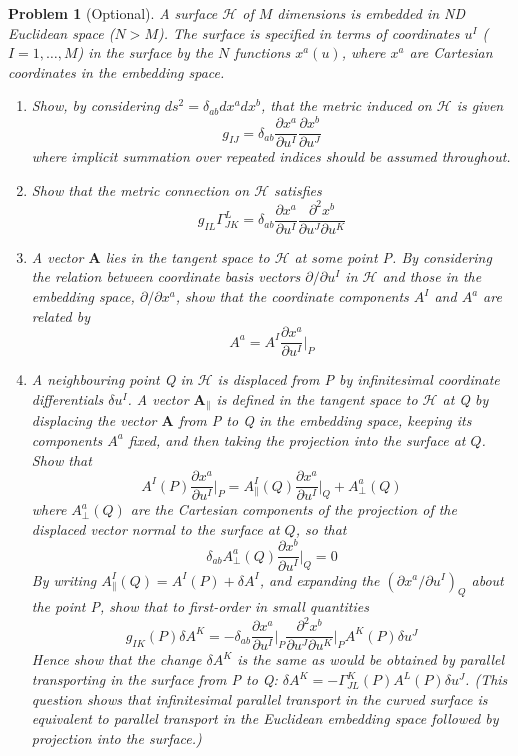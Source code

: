 \documentclass[a4paper]{article}
\theoremstyle{new}
\newtheorem{qns}{Problem}[section]
\begin{document}
\begin{qns}[Optional]
A surface $\mathcal{H}$ of $M$ dimensions is embedded in ND Euclidean space ($N > M$). The surface is specified in terms of coordinates $u^I$ ($I =1,\dots, M$) in the surface by the $N$ functions $x^a(u)$, where $x^a$ are Cartesian coordinates in the embedding space.
\begin{enumerate}[label=(\alph*)]
\item Show, by considering $ds^2=\delta_{ab}dx^adx^b$, that the metric induced on $\mathcal{H}$ is given 
$$g_{IJ}=\delta_{ab}\frac{\partial x^a}{\partial u^I}\frac{\partial x^b}{\partial u^J}$$
where implicit summation over repeated indices should be assumed throughout.
\item Show that the metric connection on $\mathcal{H}$ satisfies
$$g_{IL}\Gamma^L_{JK}=\delta_{ab}\frac{\partial x^a}{\partial u^I}\frac{\partial^2x^b}{\partial u^J\partial u^K}$$
\item A vector $\mathbf{A}$ lies in the tangent space to $\mathcal{H}$ at some point P. By considering the relation between coordinate basis vectors $\partial/\partial u^I$ in $\mathcal{H}$ and those in the embedding space, $\partial/\partial x^a$, show that the coordinate components $A^I$ and $A^a$ are related by
$$A^a=A^I\frac{\partial x^a}{\partial u^I}\bigg|_P$$
\item  A neighbouring point Q in $\mathcal{H}$ is displaced from P by infinitesimal coordinate differentials $\delta u^I$. A vector $\mathbf{A}_{\parallel}$ is defined in the tangent space to $\mathcal{H}$ at Q by displacing the vector $\mathbf{A}$ from P to Q in the embedding space, keeping its components $A^a$ fixed, and then taking the projection into the surface at $Q$. Show that
$$A^I(P)\frac{\partial x^a}{\partial u^I}\bigg|_P=A_{\parallel}^I(Q)\frac{\partial x^a}{\partial u^I}\bigg|_Q+A^a_\perp(Q)$$
where $A^a_\perp(Q)$ are the Cartesian components of the projection of the displaced vector normal to the surface at $Q$, so that
$$\delta_{ab}A_\perp^a(Q)\frac{\partial x^b}{\partial u^I}\bigg|_Q=0$$
By writing $A^I_\parallel(Q)=A^I(P)+\delta A^I$, and expanding the $(\partial x^a/\partial u^I)_Q$ about the point P, show that to first-order in small quantities
$$g_{IK}(P)\delta A^K=-\delta_{ab}\frac{\partial x^a}{\partial u^I}\bigg|_P\frac{\partial^2x^b}{\partial u^J\partial u^K}\bigg|_PA^K(P)\delta u^J$$
Hence show that the change $\delta A^K$ is the same as would be obtained by parallel transporting in the surface from P to Q: $\delta A^K=-\Gamma^K_{JL}(P)A^L(P)\delta u^J$. (This question shows that infinitesimal parallel transport in the curved surface is equivalent to parallel transport in the Euclidean embedding space followed by projection into the surface.)
\end{enumerate}
\end{qns}
\end{document}
